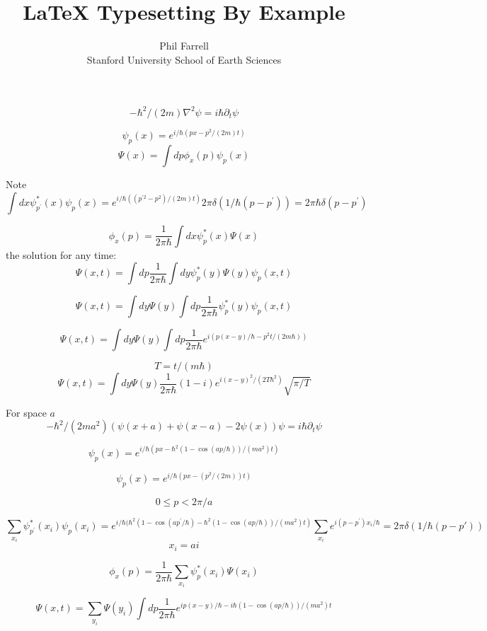 


\title{LaTeX Typesetting By Example}
\author{Phil Farrell\\
Stanford University School of Earth Sciences}

\renewcommand{\today}{November 2, 1994}
\maketitle

$$
-\hbar^2/(2m) \nabla^2 \psi = i \hbar \partial_t \psi
$$

$$
\psi_p(x) = e^{ i/\hbar (p x - p^2 /(2m)t)}
$$
$$
\Psi(x) = \int dp \phi_x(p) \psi_p(x)
$$

Note
$$
\int dx \psi_{p^\prime}^*(x) \psi_{p}(x) = e^{ i/\hbar ((p^{\prime2} - p^2) /(2m)t)} 2\pi\delta(1/\hbar(p-p^\prime))
=2\pi\hbar\delta(p-p^\prime)
$$

$$
\phi_x(p) = \frac{1}{2\pi\hbar}\int dx \psi^*_p(x) \Psi(x)
$$
the solution for any time:
$$
\Psi(x, t) = \int dp \frac{1}{2\pi\hbar}\int dy \psi^*_p(y) \Psi(y) \psi_p(x,t)
$$

$$
\Psi(x, t) = \int dy  \Psi(y) \int dp \frac{1}{2\pi\hbar}\psi^*_p(y) \psi_p(x,t)
$$

$$
\Psi(x, t) = \int dy  \Psi(y) \int dp \frac{1}{2\pi\hbar} e^{i(p(x-y)/\hbar - p^2 t/(2m\hbar))}
$$

$$
T=t/(m\hbar)
$$
$$
\Psi(x, t) = \int dy  \Psi(y) \frac{1}{2\pi\hbar} (1-i) e^{i (x-y)^2 / (2 T \hbar^2)}  \sqrt{\pi / T}
$$


For space $a$
$$
-\hbar^2/(2m a^2) (\psi(x+a) + \psi(x-a) - 2\psi(x)) \psi = i \hbar \partial_t \psi
$$

$$
\psi_p(x) = e^{ i/\hbar (p x - \hbar^2(1 - \cos(a p/\hbar))/(m a^2)t)}
$$

$$
\psi_p(x) = e^{ i/\hbar (p x - (p^2/(2m))t)}
$$

$$
0 \le p < 2\pi / a
$$

$$
\sum_{x_i} \psi_{p^\prime}^*(x_i) \psi_{p}(x_i) = e^{ i/\hbar (\hbar^2(1 - \cos(a p^\prime/\hbar) - \hbar^2(1 - \cos(a p/\hbar))/(m a^2)t)}
\sum_{x_i}e^{i(p-p^\prime)x_i/\hbar} = 2\pi\delta(1/\hbar(p - p\prime))
$$
$$
x_i = ai
$$

$$
\phi_x(p) = \frac{1}{2\pi\hbar}\sum_{x_i} \psi^*_p(x_i) \Psi(x_i)
$$

$$
\Psi(x, t) = \sum_{y_i} \Psi(y_i) \int dp \frac{1}{2\pi\hbar} e^{ ip(x-y)/\hbar - i\hbar(1 - \cos(a p/\hbar))/(m a^2)t}
$$



